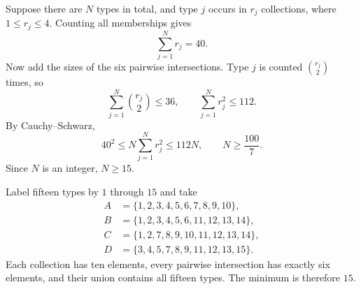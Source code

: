 Suppose there are $N$ types in total, and type $j$ occurs in $r_j$ collections, where $1\le r_j\le4$. Counting all memberships gives
\[
 \sum_{j=1}^N r_j=40.
\]
Now add the sizes of the six pairwise intersections. Type $j$ is counted $\binom{r_j}{2}$ times, so
\[
 \sum_{j=1}^N\binom{r_j}{2}\le36,
 \qquad \sum_{j=1}^N r_j^2\le112.
\]
By Cauchy--Schwarz,
\[
 40^2\le N\sum_{j=1}^N r_j^2\le112N,
 \qquad N\ge\frac{100}{7}.
\]
Since $N$ is an integer, $N\ge15$.

Label fifteen types by $1$ through $15$ and take
\[
 \begin{aligned}
 A&=\{1,2,3,4,5,6,7,8,9,10\},\\
 B&=\{1,2,3,4,5,6,11,12,13,14\},\\
 C&=\{1,2,7,8,9,10,11,12,13,14\},\\
 D&=\{3,4,5,7,8,9,11,12,13,15\}.
 \end{aligned}
\]
Each collection has ten elements, every pairwise intersection has exactly six elements, and their union contains all fifteen types. The minimum is therefore $\boxed{15}$.
